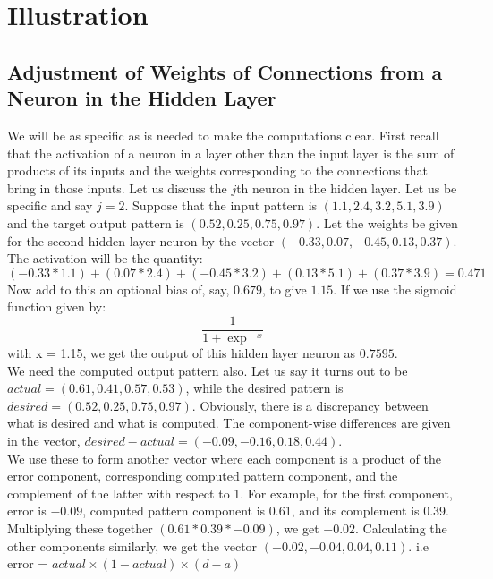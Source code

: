 \documentclass[12pt, right open]{memoir}
\begin{document}
\section{Illustration}
\subsection{Adjustment of Weights of Connections from a Neuron in
the Hidden Layer}

We will be as specific as is needed to make the computations clear. First recall that the activation of a neuron in a layer other than the input layer is the sum of products of its inputs and the weights corresponding to the connections that bring in those inputs. Let us discuss the $j$th neuron in the hidden layer. Let us be specific and say $j = 2$. Suppose that the input pattern is $(1.1, 2.4, 3.2, 5.1, 3.9)$ and the target output pattern is $(0.52, 0.25, 0.75, 0.97)$. Let the weights be given for the second hidden layer
neuron by the vector $(-0.33, 0.07, -0.45, 0.13, 0.37)$. The activation will be the quantity:\\

$(-0.33 * 1.1) + (0.07 * 2.4) + (-0.45 * 3.2) + (0.13 * 5.1)
+ (0.37 * 3.9) = 0.471$\\

Now add to this an optional bias of, say, $0.679$, to give $1.15$. 
If we use the sigmoid function given by:
\[
 \frac{1}{1+\exp{^{-x}}}
\]
with x = 1.15, we get the output of this hidden layer neuron as $0.7595$.\\

We need the computed output pattern also. Let us say it turns out to be $actual = (0.61, 0.41, 0.57, 0.53)$, while the desired pattern is $desired = (0.52, 0.25, 0.75, 0.97)$. Obviously, there is a discrepancy between what is desired and what is computed. The component-wise differences are given in the vector, $desired - actual = (-0.09, -0.16, 0.18, 0.44)$.\\

We use these to form another vector where each component is a product of the error component, corresponding computed pattern component, and the complement of the latter with respect to 1. For example, for the first component, error is $-0.09$, computed pattern component is 0.61, and its complement is 0.39. Multiplying these together $(0.61*0.39*-0.09)$, we get $-0.02$. Calculating the other components similarly, we get the vector $(-0.02, -0.04, 0.04, 0.11)$.  i.e  error = $actual \times (1 - actual) \times (d - a)$ \\
\end{document}
